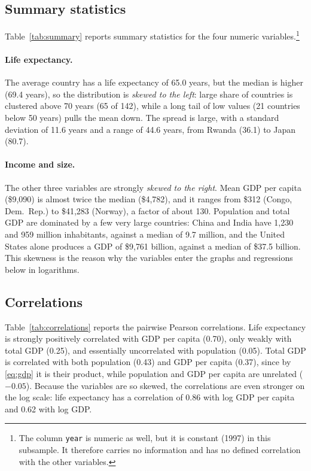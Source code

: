 \documentclass[a4paper,12pt]{article}
\begin{document}
\subsection{Summary statistics}

Table~\ref{tab:summary} reports summary statistics for the four numeric variables.\footnote{
    The column \texttt{year} is numeric as well, but it is constant (1997) in this subsample. It therefore carries no information and has no defined correlation with the other variables.
}



\paragraph{Life expectancy.} The average country has a life expectancy of 65.0 years, but the median is higher (69.4 years), so the distribution is \emph{skewed to the left}: large share of countries is clustered above 70 years (65 of 142), while a long tail of low values (21 countries below 50 years) pulls the mean down. The spread is large, with a standard deviation of 11.6 years and a range of 44.6 years, from Rwanda (36.1) to Japan (80.7).

\paragraph{Income and size.} The other three variables are strongly \emph{skewed to the right}. Mean GDP per capita (\$9{,}090) is almost twice the median (\$4{,}782), and it ranges from \$312 (Congo, Dem.\ Rep.) to \$41{,}283 (Norway), a factor of about 130. Population and total GDP are dominated by a few very large countries: China and India have 1{,}230 and 959 million inhabitants, against a median of 9.7 million, and the United States alone produces a GDP of \$9{,}761 billion, against a median of \$37.5 billion. This skewness is the reason why the variables enter the graphs and regressions below in logarithms.

\FloatBarrier
\subsection{Correlations}

Table~\ref{tab:correlations} reports the pairwise Pearson correlations. Life expectancy is strongly positively correlated with GDP per capita (0.70), only weakly with total GDP (0.25), and essentially uncorrelated with population (0.05). Total GDP is correlated with both population (0.43) and GDP per capita (0.37), since by \eqref{eq:gdp} it is their product, while population and GDP per capita are unrelated ($-0.05$). Because the variables are so skewed, the correlations are even stronger on the log scale: life expectancy has a correlation of 0.86 with log GDP per capita and 0.62 with log GDP.
\end{document}
